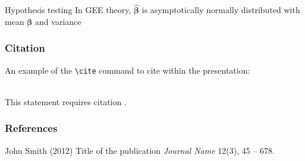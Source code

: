\documentclass{beamer}
\begin{document}

\begin{frame}[t]{Hypothesis testing}
  In GEE theory,
  $\hat{\boldsymbol \beta}$ is asymptotically normally distributed with mean $\boldsymbol \beta$ and variance
\end{frame}













\begin{frame}[fragile] %
\frametitle{Citation}
An example of the \verb|\cite| command to cite within the presentation:\\~

This statement requires citation \cite{p1}.
\end{frame}


\begin{frame}
\frametitle{References}
\footnotesize{
\begin{thebibliography}{99} %
 John Smith (2012)
\newblock Title of the publication
\newblock \emph{Journal Name} 12(3), 45 -- 678.
\end{thebibliography}
}
\end{frame}



\end{document}
